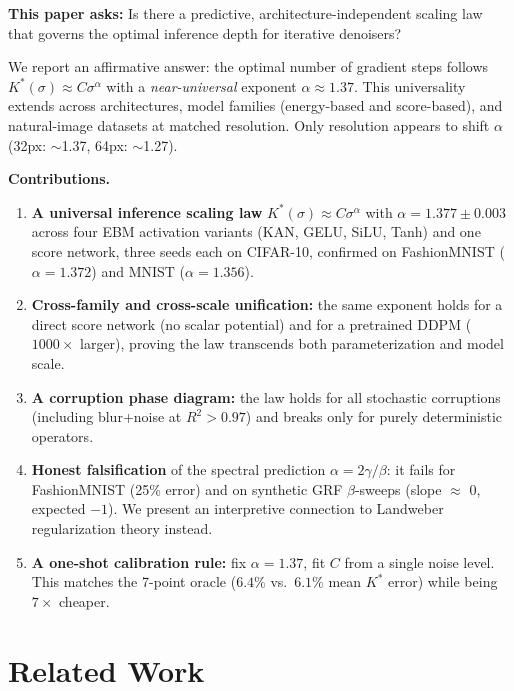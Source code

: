 \documentclass[letterpaper]{article}
\begin{document}
\textbf{This paper asks:} Is there a predictive,
architecture-independent scaling law that governs the optimal
inference depth for iterative denoisers?

We report an affirmative answer: the optimal number of gradient
steps follows $K^*(\sigma) \approx C\sigma^\alpha$ with a
\emph{near-universal} exponent $\alpha \approx 1.37$.
This universality extends across architectures, model families
(energy-based and score-based), and natural-image datasets at
matched resolution.
Only resolution appears to shift $\alpha$ (32px: $\sim$1.37,
64px: $\sim$1.27).

\textbf{Contributions.}
\begin{enumerate}[leftmargin=*,topsep=2pt,itemsep=1pt,parsep=0pt]
\item \textbf{A universal inference scaling law}
  $K^{*}(\sigma) \approx C\sigma^{\alpha}$ with
  $\alpha = 1.377 \pm 0.003$ across four EBM activation variants
  (KAN, GELU, SiLU, Tanh) and one score network,
  three seeds each on CIFAR-10, confirmed on FashionMNIST
  ($\alpha{=}1.372$) and MNIST ($\alpha{=}1.356$).

\item \textbf{Cross-family and cross-scale unification:} the same
  exponent holds for a direct score network (no scalar potential)
  and for a pretrained DDPM ($1000\times$ larger),
  proving the law transcends both parameterization and model scale.

\item \textbf{A corruption phase diagram:} the law holds for
  all stochastic corruptions (including blur+noise at $R^2 > 0.97$)
  and breaks only for purely deterministic operators.

\item \textbf{Honest falsification} of the spectral prediction
  $\alpha = 2\gamma/\beta$: it fails for FashionMNIST (25\% error)
  and on synthetic GRF $\beta$-sweeps (slope $\approx$ 0,
  expected $-1$). We present an interpretive connection to
  Landweber regularization theory instead.

\item \textbf{A one-shot calibration rule:} fix
  $\alpha{=}1.37$, fit $C$ from a single noise level.
  This matches the 7-point oracle ($6.4\%$ vs.\ $6.1\%$ mean
  $K^*$ error) while being $7\times$ cheaper.
\end{enumerate}

\section{Related Work}
\label{sec:related}
\end{document}
